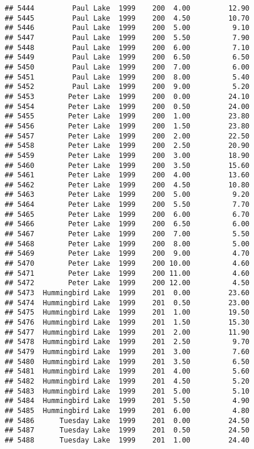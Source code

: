 \documentclass[
]{article}
\begin{document}
\begin{verbatim}
## 5444         Paul Lake  1999    200  4.00         12.90
## 5445         Paul Lake  1999    200  4.50         10.70
## 5446         Paul Lake  1999    200  5.00          9.10
## 5447         Paul Lake  1999    200  5.50          7.90
## 5448         Paul Lake  1999    200  6.00          7.10
## 5449         Paul Lake  1999    200  6.50          6.50
## 5450         Paul Lake  1999    200  7.00          6.00
## 5451         Paul Lake  1999    200  8.00          5.40
## 5452         Paul Lake  1999    200  9.00          5.20
## 5453        Peter Lake  1999    200  0.00         24.10
## 5454        Peter Lake  1999    200  0.50         24.00
## 5455        Peter Lake  1999    200  1.00         23.80
## 5456        Peter Lake  1999    200  1.50         23.80
## 5457        Peter Lake  1999    200  2.00         22.50
## 5458        Peter Lake  1999    200  2.50         20.90
## 5459        Peter Lake  1999    200  3.00         18.90
## 5460        Peter Lake  1999    200  3.50         15.60
## 5461        Peter Lake  1999    200  4.00         13.60
## 5462        Peter Lake  1999    200  4.50         10.80
## 5463        Peter Lake  1999    200  5.00          9.20
## 5464        Peter Lake  1999    200  5.50          7.70
## 5465        Peter Lake  1999    200  6.00          6.70
## 5466        Peter Lake  1999    200  6.50          6.00
## 5467        Peter Lake  1999    200  7.00          5.50
## 5468        Peter Lake  1999    200  8.00          5.00
## 5469        Peter Lake  1999    200  9.00          4.70
## 5470        Peter Lake  1999    200 10.00          4.60
## 5471        Peter Lake  1999    200 11.00          4.60
## 5472        Peter Lake  1999    200 12.00          4.50
## 5473  Hummingbird Lake  1999    201  0.00         23.60
## 5474  Hummingbird Lake  1999    201  0.50         23.00
## 5475  Hummingbird Lake  1999    201  1.00         19.50
## 5476  Hummingbird Lake  1999    201  1.50         15.30
## 5477  Hummingbird Lake  1999    201  2.00         11.90
## 5478  Hummingbird Lake  1999    201  2.50          9.70
## 5479  Hummingbird Lake  1999    201  3.00          7.60
## 5480  Hummingbird Lake  1999    201  3.50          6.50
## 5481  Hummingbird Lake  1999    201  4.00          5.60
## 5482  Hummingbird Lake  1999    201  4.50          5.20
## 5483  Hummingbird Lake  1999    201  5.00          5.10
## 5484  Hummingbird Lake  1999    201  5.50          4.90
## 5485  Hummingbird Lake  1999    201  6.00          4.80
## 5486      Tuesday Lake  1999    201  0.00         24.50
## 5487      Tuesday Lake  1999    201  0.50         24.50
## 5488      Tuesday Lake  1999    201  1.00         24.40

\end{verbatim}
\end{document}
